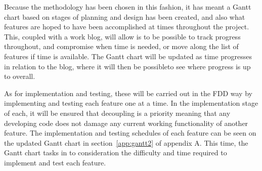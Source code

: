 Because the methodology has been chosen in this fashion, it has meant a Gantt chart based on stages of planning and design has been created, and also what features are hoped to have been accomplished at times throughout the project. This, coupled with a work blog, will allow is to be possible to track progress throughout, and compromise when time is needed, or move along the list of features if time is available. The Gantt chart will be updated as time progresses in relation to the blog, where it will then be possibleto see where progress is up to overall.

As for implementation and testing, these will be carried out in the FDD way by implementing and testing each feature one at a time. In the implementation stage of each, it will be ensured that decoupling is a priority meaning that any developing code does not damage any current working functionality of another feature. The implementation and testing schedules of each feature can be seen on the updated Gantt chart in section~\ref{app:gantt2} of appendix A. This time, the Gantt chart tasks in to consideration the difficulty and time required to implement and test each feature.